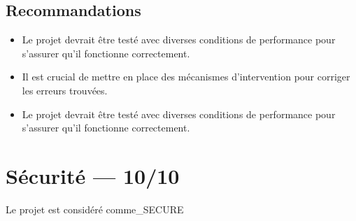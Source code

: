 \documentclass[11pt,a4paper]{article}
\begin{document}
\subsection*{Recommandations}
\begin{itemize}
  \item Le projet devrait être testé avec diverses conditions de performance pour s'assurer qu'il fonctionne correctement.
  \item Il est crucial de mettre en place des mécanismes d'intervention pour corriger les erreurs trouvées.
  \item Le projet devrait être testé avec diverses conditions de performance pour s'assurer qu'il fonctionne correctement.
\end{itemize}

\section{Sécurité — 10/10}
Le projet est considéré comme\_SECURE
\end{document}
